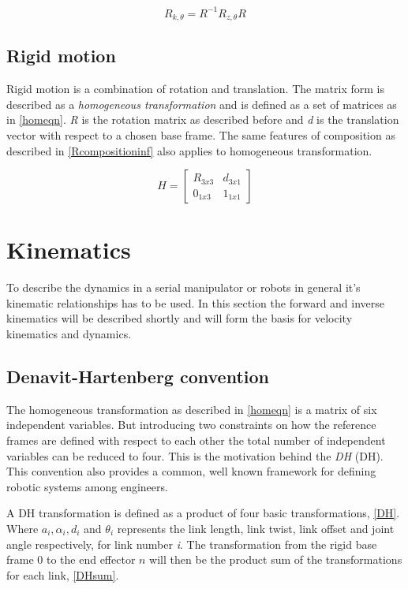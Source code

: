 \begin{equation}\label{axisanglerot}
R_{k,\theta} = R^{-1} R_{z,\theta} R
\end{equation}

\subsection{Rigid motion}

Rigid motion is a combination of rotation and translation. The matrix form is described as a \textit{homogeneous transformation} and is defined as a set of matrices as in \eqref{homeqn}. \textit{R} is the rotation matrix as described before and \textit{d} is the translation vector with respect to a chosen base frame. The same features of composition as described in \eqref{Rcompositioninf} also applies to homogeneous transformation.

\begin{equation}\label{homeqn}
H = \begin{bmatrix}
R_{3x3} & d_{3x1}\\ 
0_{1x3} & 1_{1x1}
\end{bmatrix}
\end{equation}


\section{Kinematics}

To describe the dynamics in a serial manipulator or robots in general it's kinematic relationships has to be used. In this section the forward and inverse kinematics will be described shortly and will form the basis for velocity kinematics and dynamics.

\subsection{Denavit-Hartenberg convention}

The homogeneous transformation as described in \eqref{homeqn} is a matrix of six independent variables. But introducing two constraints on how the reference frames are defined with respect to each other the total number of independent variables can be reduced to four. This is the motivation behind the \textit{\gls{DH}} (DH). This convention also provides a common, well known framework for defining robotic systems among engineers.

A DH transformation is defined as a product of four basic transformations, \eqref{DH}. Where $a_i, \alpha_i, d_i $ and $\theta_i$ represents the link length, link twist, link offset and joint angle respectively, for link number \textit{i}. The transformation from the rigid base frame $0$ to the end effector $n$ will then be the product sum of the transformations for each link, \eqref{DHsum}.

